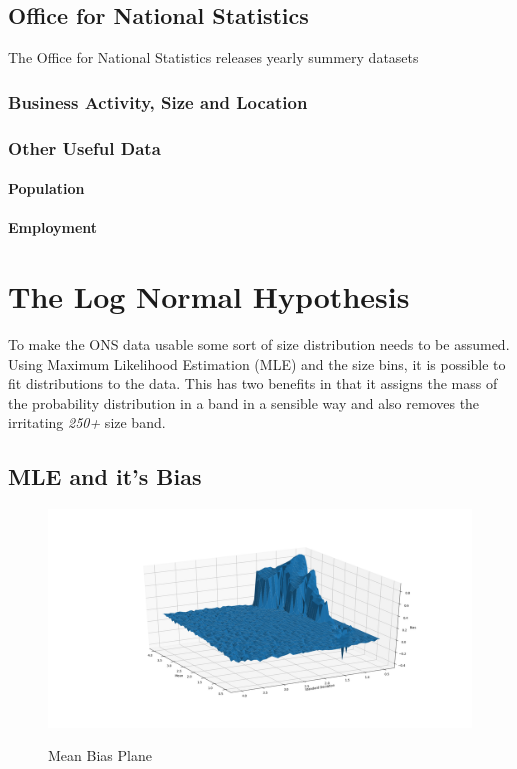 \documentclass[a4paper,10pt]{article}
\begin{document}
   \subsection{Office for National Statistics}
   The Office for National Statistics releases yearly summery datasets
   \subsubsection{Business Activity, Size and Location}
   \subsubsection{Other Useful Data}
   \paragraph{Population}
   \paragraph{Employment}

   \section{The Log Normal Hypothesis}
   To make the ONS data usable some sort of size distribution needs to be assumed. Using Maximum Likelihood Estimation (MLE) and the size bins, it is possible to fit distributions to the data. This has two benefits in that it assigns the mass of the probability distribution in a band in a sensible way and also removes the irritating \emph{250+} size band.
   \subsection{MLE and it's Bias}
  

   \begin{figure}
      \caption{Mean Bias Plane}
      \includegraphics[width=\textwidth]{mean_bias_close}
      \label{fig:bias}
   \end{figure} 
\end{document}
